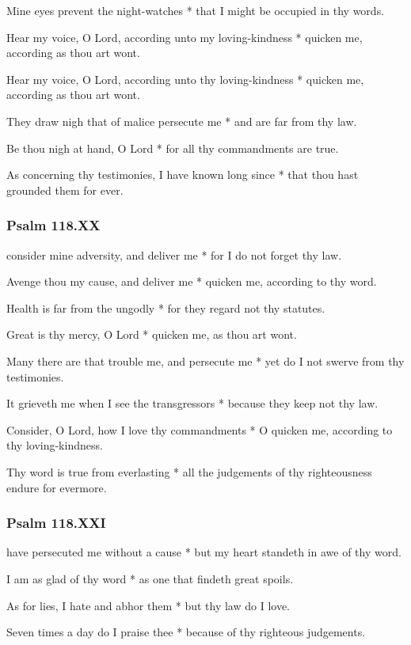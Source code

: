 Mine eyes prevent the night-watches * that I might be occupied in thy words.

Hear my voice, O Lord, according unto my loving-kindness * quicken me, according as thou art wont.

Hear my voice, O Lord, according unto thy loving-kindness * quicken me, according as thou art wont.

They draw nigh that of malice persecute me * and are far from thy law.

Be thou nigh at hand, O Lord * for all thy commandments are true.

As concerning thy testimonies, I have known long since * that thou hast grounded them for ever.

\subsubsection{Psalm 118.XX}

 consider mine adversity, and deliver me * for I do not forget thy law.

Avenge thou my cause, and deliver me * quicken me, according to thy word.

Health is far from the ungodly * for they regard not thy statutes.

Great is thy mercy, O Lord * quicken me, as thou art wont.

Many there are that trouble me, and persecute me * yet do I not swerve from thy testimonies.

It grieveth me when I see the transgressors * because they keep not thy law.

Consider, O Lord, how I love thy commandments * O quicken me, according to thy loving-kindness.

Thy word is true from everlasting * all the judgements of thy righteousness endure for evermore.

\subsubsection{Psalm 118.XXI}

 have persecuted me without a cause * but my heart standeth in awe of thy word.

I am as glad of thy word * as one that findeth great spoils.

As for lies, I hate and abhor them * but thy law do I love.

Seven times a day do I praise thee * because of thy righteous judgements.

